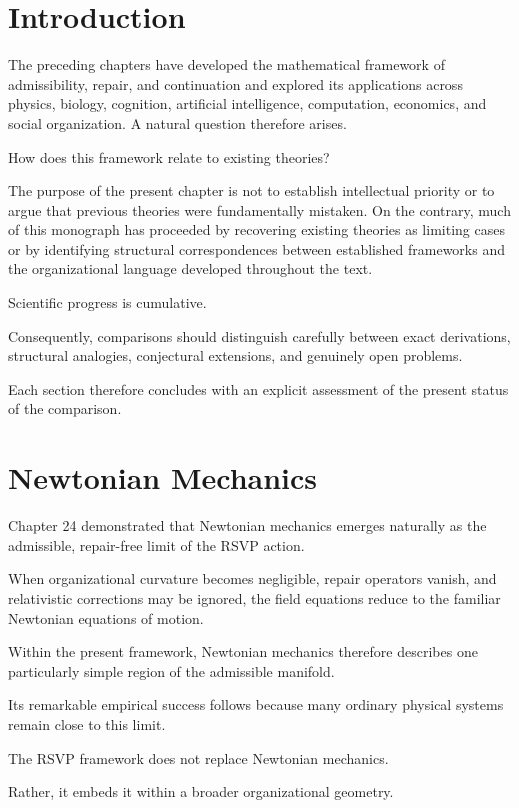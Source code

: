 \documentclass[11pt,oneside]{book}
\numberwithin{equation}{chapter}
\theoremstyle{definition}
\theoremstyle{plain}
\begin{document}
\section{Introduction}

The preceding chapters have developed the mathematical framework of
admissibility, repair, and continuation and explored its applications
across physics, biology, cognition, artificial intelligence, computation,
economics, and social organization. A natural question therefore arises.

How does this framework relate to existing theories?

The purpose of the present chapter is not to establish intellectual
priority or to argue that previous theories were fundamentally mistaken. On
the contrary, much of this monograph has proceeded by recovering existing
theories as limiting cases or by identifying structural correspondences
between established frameworks and the organizational language developed
throughout the text.

Scientific progress is cumulative.

Consequently, comparisons should distinguish carefully between exact
derivations, structural analogies, conjectural extensions, and genuinely
open problems.

Each section therefore concludes with an explicit assessment of the
present status of the comparison.

\section{Newtonian Mechanics}

Chapter 24 demonstrated that Newtonian mechanics emerges naturally as the
admissible, repair-free limit of the RSVP action.

When organizational curvature becomes negligible, repair operators vanish,
and relativistic corrections may be ignored, the field equations reduce to
the familiar Newtonian equations of motion.

Within the present framework, Newtonian mechanics therefore describes one
particularly simple region of the admissible manifold.

Its remarkable empirical success follows because many ordinary physical
systems remain close to this limit.

The RSVP framework does not replace Newtonian mechanics.

Rather, it embeds it within a broader organizational geometry.
\end{document}
